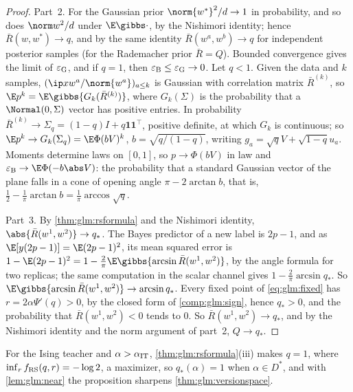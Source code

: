 \begin{refsection}
\begin{proof}
Part~2. For the Gaussian prior $\norm{w^*}^2/d\to1$ in probability, and so does $\norm w^2/d$ under $\E\gibbs\cdot$, by the Nishimori identity; hence $\bar R(w,w^*)\to q$, and by the same identity $\bar R(w^a,w^b)\to q$ for independent posterior samples (for the Rademacher prior $\bar R=Q$). Bounded convergence gives the limit of $\varepsilon_{\mathrm{G}}$, and if $q=1$, then $\varepsilon_{\mathrm{B}}\le\varepsilon_{\mathrm{G}}\to0$. Let $q<1$. Given the data and $k$ samples, $(\ip x{w^a}/\norm{w^a})_{a\le k}$ is Gaussian with correlation matrix $\bar R^{(k)}$, so $\E p^k=\E\gibbs{G_k(\bar R^{(k)})}$, where $G_k(\Sigma)$ is the probability that a $\Normal(0,\Sigma)$ vector has positive entries. In probability $\bar R^{(k)}\to\Sigma_q=(1-q)I+q\mathbf1\mathbf1^\top$, positive definite, at which $G_k$ is continuous; so $\E p^k\to G_k(\Sigma_q)=\E\Phi(bV)^k$, $b=\sqrt{q/(1-q)}$, writing $g_a=\sqrt qV+\sqrt{1-q}u_a$. Moments determine laws on $[0,1]$, so $p\to\Phi(bV)$ in law and $\glmB\to\E\Phi(-b\abs V)$: the probability that a standard Gaussian vector of the plane falls in a cone of opening angle $\pi-2\arctan b$, that is, $\frac12-\frac1\pi\arctan b=\frac1\pi\arccos\sqrt q$.

Part~3. By \cref{thm:glm:rsformula} and the Nishimori identity, $\abs{\bar R(w^1,w^2)}\to q_*$. The Bayes predictor of a new label is $2p-1$, and as $\E[y(2p-1)]=\E(2p-1)^2$, its mean squared error is $1-\E(2p-1)^2=1-\frac2\pi\E\gibbs{\arcsin\bar R(w^1,w^2)}$, by the angle formula for two replicas; the same computation in the scalar channel gives $1-\frac2\pi\arcsin q_*$. So $\E\gibbs{\arcsin\bar R(w^1,w^2)}\to\arcsin q_*$. Every fixed point of \eqref{eq:glm:fixed} has $r=2\alpha\Psi'(q)>0$, by the closed form of \cref{comp:glm:sign}, hence $q_*>0$, and the probability that $\bar R(w^1,w^2)<0$ tends to $0$. So $\bar R(w^1,w^2)\to q_*$, and by the Nishimori identity and the norm argument of part~2, $Q\to q_*$.
\end{proof}

For the Ising teacher and $\alpha>\alpha_{\mathrm{IT}}$, \cref{thm:glm:rsformula}(iii) makes $q=1$, where $\inf_rf_{\mathrm{RS}}(q,r)=-\log2$, a maximizer, so $q_*(\alpha)=1$ when $\alpha\in D^*$, and with \cref{lem:glm:near} the proposition sharpens \cref{thm:glm:versionspace}.



\end{refsection}
